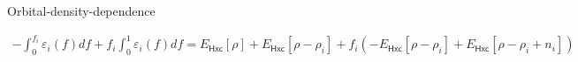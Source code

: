 \documentclass[xcolor=table,aspectratio=169]{beamer}
\numberwithin{equation}{section}
\begin{document}
\begin{frame}{Orbital-density-dependence}

   \begin{align*}
      -
      {\int^{f_i}_{0} \varepsilon_i(f) df}
      +
      {f_i \int_0^1 \varepsilon_i(f) df}
      = E_\mathsf{Hxc}[\rho] + E_\mathsf{Hxc}[\rho - \rho_i]
      + f_i\left(-E_\mathsf{Hxc}[\rho - \rho_i] + E_\mathsf{Hxc}[\rho - \rho_i + n_i]\right)
   \end{align*}



\end{frame}
\end{document}
